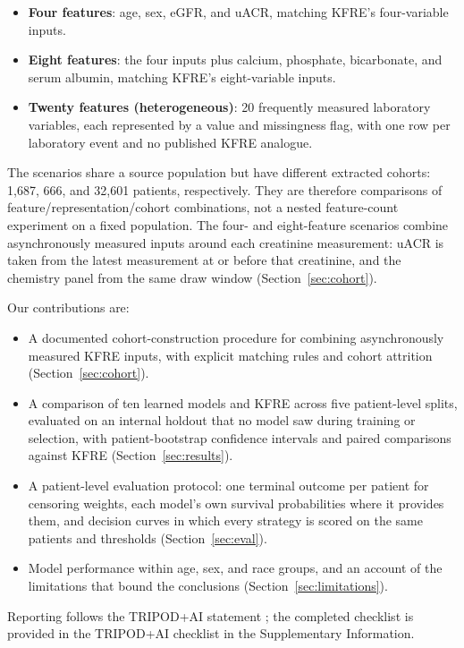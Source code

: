 \begin{itemize}
    \item \textbf{Four features}: age, sex, eGFR, and uACR, matching KFRE's four-variable inputs.
    \item \textbf{Eight features}: the four inputs plus calcium, phosphate, bicarbonate, and serum albumin, matching KFRE's eight-variable inputs.
    \item \textbf{Twenty features (heterogeneous)}: 20 frequently measured laboratory variables, each represented by a value and missingness flag, with one row per laboratory event and no published KFRE analogue.
\end{itemize}

The scenarios share a source population but have different extracted cohorts: 1{,}687, 666, and 32{,}601 patients, respectively. They are therefore comparisons of feature/representation/cohort combinations, not a nested feature-count experiment on a fixed population. The four- and eight-feature scenarios combine asynchronously measured inputs around each creatinine measurement: uACR is taken from the latest measurement at or before that creatinine, and the chemistry panel from the same draw window (Section~\ref{sec:cohort}).

Our contributions are:
\begin{itemize}
    \item A documented cohort-construction procedure for combining asynchronously measured KFRE inputs, with explicit matching rules and cohort attrition (Section~\ref{sec:cohort}).
    \item A comparison of ten learned models and KFRE across five patient-level splits, evaluated on an internal holdout that no model saw during training or selection, with patient-bootstrap confidence intervals and paired comparisons against KFRE (Section~\ref{sec:results}).
    \item A patient-level evaluation protocol: one terminal outcome per patient for censoring weights, each model's own survival probabilities where it provides them, and decision curves in which every strategy is scored on the same patients and thresholds (Section~\ref{sec:eval}).
    \item Model performance within age, sex, and race groups, and an account of the limitations that bound the conclusions (Section~\ref{sec:limitations}).
\end{itemize}
Reporting follows the TRIPOD+AI statement \citep{collins2024tripodai}; the completed checklist is provided in the TRIPOD+AI checklist in the Supplementary Information.
